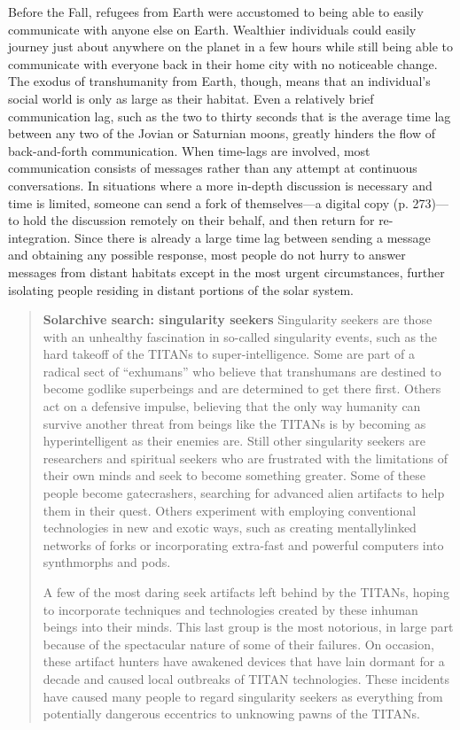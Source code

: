 Before the Fall, refugees from Earth were accustomed to being able to easily communicate with anyone else on Earth. Wealthier individuals could easily journey just about anywhere on the planet in a few hours while still being able to communicate with everyone back in their home city with no noticeable change. The exodus of transhumanity from Earth, though, means that an individual's social world is only as large as their habitat. Even a relatively brief communication lag, such as the two to thirty seconds that is the average time lag between any two of the Jovian or Saturnian moons, greatly hinders the flow of back-and-forth communication. When time-lags are involved, most communication consists of messages rather than any attempt at continuous conversations. In situations where a more in-depth discussion is necessary and time is limited, someone can send a fork of themselves—a digital copy (p. 273)—to hold the discussion remotely on their behalf, and then return for re-integration. Since there is already a large time lag between sending a message and obtaining any possible response, most people do not hurry to answer messages from distant habitats except in the most urgent circumstances, further isolating people residing in distant portions of the solar system. 

\begin{quotation}
\textbf{Solarchive search: singularity seekers}  Singularity seekers are those with an unhealthy fascination in so-called singularity events, such as the hard takeoff of the TITANs to super-intelligence. Some are part of a radical sect of “exhumans” who believe that transhumans are destined to become godlike superbeings and are determined to get there first. Others act on a defensive impulse, believing that the only way humanity can survive another threat from beings like the TITANs is by becoming as hyperintelligent as their enemies are. Still other singularity seekers are researchers and spiritual seekers who are frustrated with the limitations of their own minds and seek to become something greater. Some of these people become gatecrashers, searching for advanced alien artifacts to help them in their quest. Others experiment with employing conventional technologies in new and exotic ways, such as creating mentallylinked networks of forks or incorporating extra-fast and powerful computers into synthmorphs and pods. 

 A few of the most daring seek artifacts left behind by the TITANs, hoping to incorporate techniques and technologies created by these inhuman beings into their minds. This last group is the most notorious, in large part because of the spectacular nature of some of their failures. On occasion, these artifact hunters have awakened devices that have lain dormant for a decade and caused local outbreaks of TITAN technologies. These incidents have caused many people to regard singularity seekers as everything from potentially dangerous eccentrics to unknowing pawns of the TITANs.
\end{quotation} 

